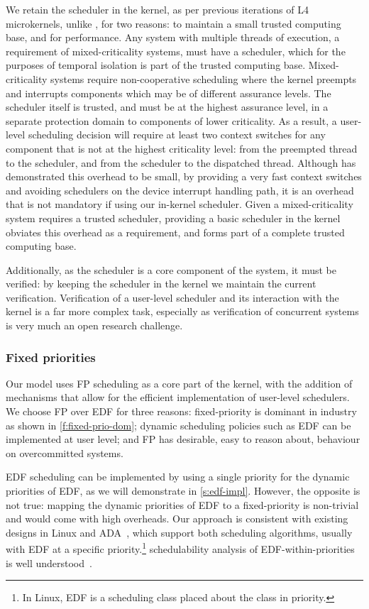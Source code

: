 We retain the scheduler in the kernel, as per previous iterations of L4 microkernels, 
unlike \composite, for two reasons: to
maintain a small trusted computing base, and for performance. Any system with
multiple threads of execution, a requirement of mixed-criticality systems,
must have a scheduler, which for the purposes of temporal isolation is part of
the trusted computing base. Mixed-criticality systems require non-cooperative scheduling where
the kernel preempts and interrupts components which may be of different assurance levels.
The scheduler itself is
trusted, and must be at the highest assurance level, in a separate protection domain to components
of lower criticality.
As a result, a user-level scheduling decision will require at least two context switches for any
component that is not at the highest criticality level:
from the preempted thread to the scheduler, and from the scheduler to the dispatched
thread. Although \composite has demonstrated this overhead to be small, by providing a very fast
context switches and avoiding schedulers on the device interrupt handling path, it is an overhead
that is not mandatory if using our in-kernel scheduler. 
Given a mixed-criticality system requires a trusted scheduler, providing a basic scheduler in the kernel 
obviates this overhead as a requirement, and forms part of a complete trusted computing base.

Additionally, as the scheduler is a core component of the system, it must be
verified: by keeping the
scheduler in the kernel we maintain the current verification. Verification of a user-level scheduler
and its interaction with the kernel is a far more complex task, especially as verification of
concurrent systems is very much an open research challenge. 

\subsubsection{Fixed priorities}

Our model uses \gls{FP} scheduling as a core part of the kernel, with the addition of mechanisms
that allow for the efficient implementation of user-level schedulers.
We choose \gls{FP} over \gls{EDF} for three reasons: 
fixed-priority is dominant in industry
as shown in \cref{f:fixed-prio-dom}; dynamic scheduling policies such as
\gls{EDF} can be implemented at user level; and \gls{FP} has desirable, easy to reason about, behaviour on overcommitted
systems.

\gls{EDF} scheduling can be implemented by using a single priority for the dynamic
priorities of \gls{EDF}, as we will demonstrate in \cref{s:edf-impl}.
However, the opposite is not true: mapping the dynamic priorities of EDF to a fixed-priority
is non-trivial and would come with high overheads. 
Our approach is consistent with existing designs in Linux and ADA~\citep{Burns_Wellings:crtpa}, which
support both scheduling algorithms, usually with \gls{EDF} at a specific priority.\footnote{In
    Linux, \gls{EDF} is a scheduling class placed about the  class in priority.}
schedulability analysis of \gls{EDF}-within-priorities is well
understood~\citep{Harbour_Palencia_03}.

